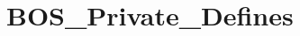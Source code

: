 \hypertarget{group___b_o_s___private___defines}{}\section{B\+O\+S\+\_\+\+Private\+\_\+\+Defines}
\label{group___b_o_s___private___defines}
